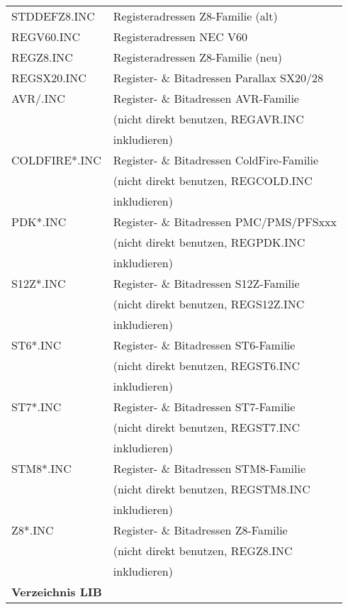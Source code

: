 \documentclass[12pt,a4paper,twoside]{report}
\begin{document}
\begin{center}
\begin{longtable}{|l|l|}
STDDEFZ8.INC      & Registeradressen Z8-Familie (alt)\\
REGV60.INC        & Registeradressen NEC V60 \\
REGZ8.INC         & Registeradressen Z8-Familie (neu)\\
REGSX20.INC       & Register- \& Bitadressen Parallax SX20/28 \\
AVR/\*.INC        & Register- \& Bitadressen AVR-Familie \\
                  & (nicht direkt benutzen, REGAVR.INC \\
                  & inkludieren) \\
COLDFIRE\/*.INC   & Register- \& Bitadressen ColdFire-Familie \\
                  & (nicht direkt benutzen, REGCOLD.INC \\
                  & inkludieren) \\
PDK\/*.INC        & Register- \& Bitadressen PMC/PMS/PFSxxx \\
                  & (nicht direkt benutzen, REGPDK.INC \\
                  & inkludieren) \\
S12Z\/*.INC       & Register- \& Bitadressen S12Z-Familie \\
                  & (nicht direkt benutzen, REGS12Z.INC \\
                  & inkludieren) \\
ST6\/*.INC        & Register- \& Bitadressen ST6-Familie \\
                  & (nicht direkt benutzen, REGST6.INC \\
                  & inkludieren) \\
ST7\/*.INC        & Register- \& Bitadressen ST7-Familie \\
                  & (nicht direkt benutzen, REGST7.INC \\
                  & inkludieren) \\
STM8\/*.INC       & Register- \& Bitadressen STM8-Familie \\
                  & (nicht direkt benutzen, REGSTM8.INC \\
                  & inkludieren) \\
Z8\/*.INC         & Register- \& Bitadressen Z8-Familie \\
                  & (nicht direkt benutzen, REGZ8.INC \\
                  & inkludieren) \\
\hline
{\bf Verzeichnis LIB} & \\

\end{longtable}
\end{center}
\end{document}
